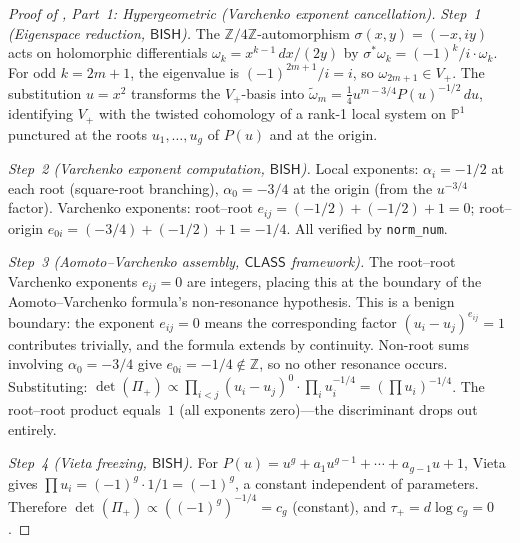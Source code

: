\documentclass[11pt]{article}
\theoremstyle{plain}
\theoremstyle{definition}
\theoremstyle{remark}
\newcommand{\ZZ}{\mathbb{Z}}
\newcommand{\BISH}{\mathsf{BISH}}
\newcommand{\CLASS}{\mathsf{CLASS}}
\begin{document}
\begin{proof}[Proof of , Part~1: Hypergeometric
  (Varchenko exponent cancellation)]
\mbox{}

\emph{Step~1 (Eigenspace reduction, $\BISH$).}  The $\ZZ/4\ZZ$-automorphism $\sigma(x,y) = (-x, iy)$ acts on holomorphic differentials $\omega_k = x^{k-1}\,dx/(2y)$ by $\sigma^*\omega_k = (-1)^k/i \cdot \omega_k$.  For odd $k = 2m+1$, the eigenvalue is $(-1)^{2m+1}/i = i$, so $\omega_{2m+1} \in V_+$.  The substitution $u = x^2$ transforms the $V_+$-basis into $\widetilde{\omega}_m = \tfrac{1}{4} u^{m - 3/4} P(u)^{-1/2}\,du$, identifying $V_+$ with the twisted cohomology of a rank-1 local system on $\mathbb{P}^1$ punctured at the roots $u_1, \ldots, u_g$ of $P(u)$ and at the origin.

\emph{Step~2 (Varchenko exponent computation, $\BISH$).}  Local exponents: $\alpha_i = -1/2$ at each root (square-root branching), $\alpha_0 = -3/4$ at the origin (from the $u^{-3/4}$ factor).  Varchenko exponents: root--root $e_{ij} = (-1/2) + (-1/2) + 1 = 0$; root--origin $e_{0i} = (-3/4) + (-1/2) + 1 = -1/4$.  All verified by \texttt{norm\_num}.

\emph{Step~3 (Aomoto--Varchenko assembly, $\CLASS$ framework).}  The root--root Varchenko exponents $e_{ij} = 0$ are integers, placing this at the boundary of the Aomoto--Varchenko formula's non-resonance hypothesis.  This is a benign boundary: the exponent $e_{ij} = 0$ means the corresponding factor $(u_i - u_j)^{e_{ij}} = 1$ contributes trivially, and the formula extends by continuity.  Non-root sums involving $\alpha_0 = -3/4$ give $e_{0i} = -1/4 \notin \ZZ$, so no other resonance occurs.  Substituting: $\det(\Pi_+) \propto \prod_{i < j}(u_i - u_j)^0 \cdot \prod_i u_i^{-1/4} = (\prod u_i)^{-1/4}$.  The root--root product equals~$1$ (all exponents zero)---the discriminant drops out entirely.

\emph{Step~4 (Vieta freezing, $\BISH$).}  For $P(u) = u^g + a_1 u^{g-1} + \cdots + a_{g-1} u + 1$, Vieta gives $\prod u_i = (-1)^g \cdot 1/1 = (-1)^g$, a constant independent of parameters.  Therefore $\det(\Pi_+) \propto ((-1)^g)^{-1/4} = c_g$ (constant), and $\tau_+ = d\log c_g = 0$.
\end{proof}
\end{document}
